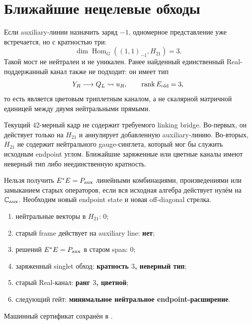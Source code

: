 \section{Ближайшие нецелевые обходы}

Если auxiliary-линии назначить заряд $-1$, одномерное представление уже
встречается, но с кратностью три:
\begin{equation}
 \dim\operatorname{Hom}_G((1,1)_{-1},H_{21})=3.
 \label{eq:v8-baryon-c0-charged-singlet-hom-dimension}
\end{equation}
Такой мост не нейтрален и не уникален. Ранее найденный единственный
Real-поддержанный канал также не подходит: он имеет тип
\begin{equation}
 Y_R\longrightarrow Q_L\rightsquigarrow u_R,
 \qquad \operatorname{rank} E_{\rm old}=3,
 \label{eq:v8-baryon-c0-old-real-channel-rank}
\end{equation}
то есть является цветовым триплетным каналом, а не скалярной матричной
единицей между двумя нейтральными прямыми.

\begin{theorem}
Текущий 42-мерный кадр не содержит требуемого linking bridge. Во-первых,
он действует только на $H_{21}$ и аннулирует добавленную auxiliary-линию.
Во-вторых, $H_{21}$ не содержит нейтрального gauge-синглета, который мог бы
служить исходным endpoint углом. Ближайшие заряженные или цветные каналы
имеют неверный тип либо неединственную кратность.
\end{theorem}

\begin{nogocriterion}
Нельзя получить $E^*E=P_{\rm aux}$ линейными комбинациями, произведениями
или замыканием старых операторов, если вся исходная алгебра действует
нулём на $\mathbb C_{\rm aux}$. Необходим новый endpoint state и новая
off-diagonal стрелка.
\end{nogocriterion}

\begin{protocol}\begin{enumerate}
\item нейтральные векторы в $H_{21}$: \textbf{$0$};
\item старый frame действует на auxiliary line: \textbf{нет};
\item решений $E^*E=P_{\rm aux}$ в старом span: \textbf{$0$};
\item заряженный singlet обход: \textbf{кратность $3$, неверный тип};
\item старый Real-канал: \textbf{ранг $3$, цветной};
\item следующий гейт: \textbf{минимальное нейтральное endpoint-расширение}.
\end{enumerate}\end{protocol}

Машинный сертификат сохранён в
.